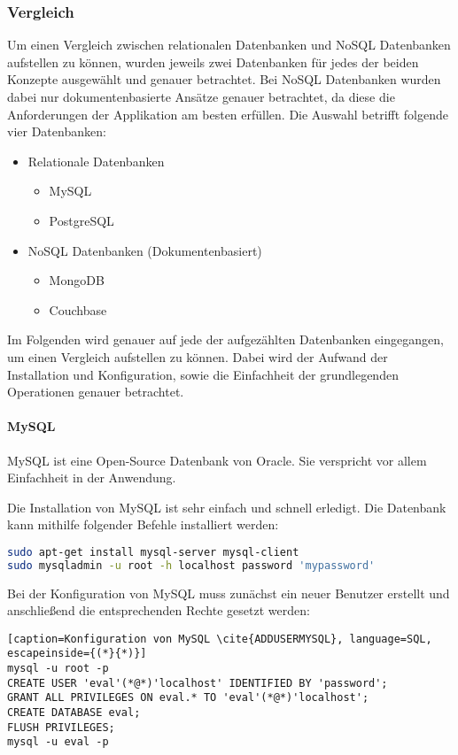\newpage

\subsubsection{Vergleich}
Um einen Vergleich zwischen relationalen Datenbanken und NoSQL Datenbanken aufstellen zu können, wurden jeweils zwei Datenbanken für jedes der beiden Konzepte ausgewählt und genauer betrachtet. Bei NoSQL Datenbanken wurden dabei nur dokumentenbasierte Ansätze genauer betrachtet, da diese die Anforderungen der Applikation am besten erfüllen. Die Auswahl betrifft folgende vier Datenbanken:
\begin{itemize}
\item Relationale Datenbanken
\begin{itemize}
\item MySQL
\item PostgreSQL
\end{itemize}
\item NoSQL Datenbanken (Dokumentenbasiert)
\begin{itemize}
\item MongoDB
\item Couchbase
\end{itemize}
\end{itemize}

Im Folgenden wird genauer auf jede der aufgezählten Datenbanken eingegangen, um einen Vergleich aufstellen zu können. Dabei wird der Aufwand der Installation und Konfiguration, sowie die Einfachheit der grundlegenden Operationen genauer betrachtet.

\newpage

\paragraph{MySQL}
\label{subsubsec:mysql}
MySQL ist eine Open-Source Datenbank von Oracle. Sie verspricht vor allem Einfachheit in der Anwendung.\cite{ABOUTMYSQL}

Die Installation von MySQL ist sehr einfach und schnell erledigt. Die Datenbank kann mithilfe folgender Befehle installiert werden:
\begin{lstlisting}[caption=Installation von MySQL \cite{MYSQLINSTALL}, language=bash]
sudo apt-get install mysql-server mysql-client
sudo mysqladmin -u root -h localhost password 'mypassword'
\end{lstlisting}

Bei der Konfiguration von MySQL muss zunächst ein neuer Benutzer erstellt und anschließend die entsprechenden Rechte gesetzt werden:
\begin{lstlisting}[caption=Konfiguration von MySQL \cite{ADDUSERMYSQL}, language=SQL, escapeinside={(*}{*)}]
mysql -u root -p
CREATE USER 'eval'(*@*)'localhost' IDENTIFIED BY 'password';
GRANT ALL PRIVILEGES ON eval.* TO 'eval'(*@*)'localhost';
CREATE DATABASE eval;
FLUSH PRIVILEGES;
mysql -u eval -p
\end{lstlisting}

